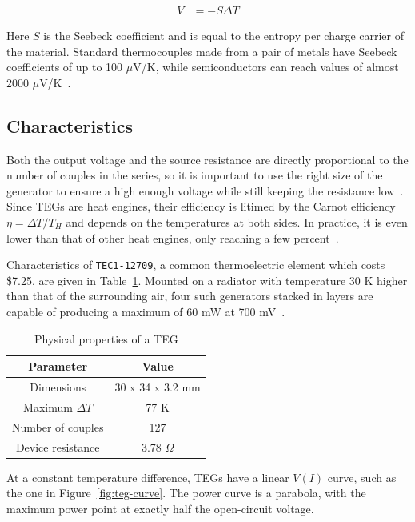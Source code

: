 \documentclass[a4paper,10pt]{article}
\begin{document}
\begin{align}
 V &= -S \Delta T
\label{eq:seebeck}
\end{align}

Here $S$ is the Seebeck coefficient and is equal to the entropy per charge carrier of the material. Standard thermocouples made from a pair of metals have Seebeck coefficients of up to 100 $\mu$V/K, while semiconductors can reach values of almost 2000 $\mu$V/K~\cite{wiki:thermo,ec:seebeck}. 

\subsection{Characteristics}

Both the output voltage and the source resistance are directly proportional to the number of couples in the series, so it is important to use the right size of the generator to ensure a high enough voltage while still keeping the resistance low~\cite{Salerno10}. Since \acp{TEG} are heat engines, their efficiency is litimed by the Carnot efficiency $\eta = \Delta T / T_H$ and depends on the temperatures at both sides. In practice, it is even lower than that of other heat engines, only reaching a few percent~\cite{teg-curve,wiki:teg}. 

Characteristics of \texttt{TEC1-12709}, a common thermoelectric element which costs \$7.25, are given in Table~\ref{tab:teg-radiator}. Mounted on a radiator with temperature 30 K higher than that of the surrounding air, four such generators stacked in layers are capable of producing a maximum of 60 mW at 700 mV~\cite{teg-wsn-ieee}. 

\begin{table}[h]
  \centering
  \begin{tabular}{|c|c|}
\hline
    Parameter & Value \\
\hline
Dimensions & 30 x 34 x 3.2 mm \\
Maximum $\Delta T$ & 77 K \\
Number of couples & 127 \\
Device resistance & 3.78 $\Omega$ \\
\hline
  \end{tabular}
\caption{Physical properties of a \ac{TEG}}
\label{tab:teg-radiator}
\end{table}

At a constant temperature difference, \acp{TEG} have a linear $V(I)$ curve, such as the one in Figure~\ref{fig:teg-curve}. The power curve is a parabola, with the maximum power point at exactly half the open-circuit voltage. 
\end{document}
